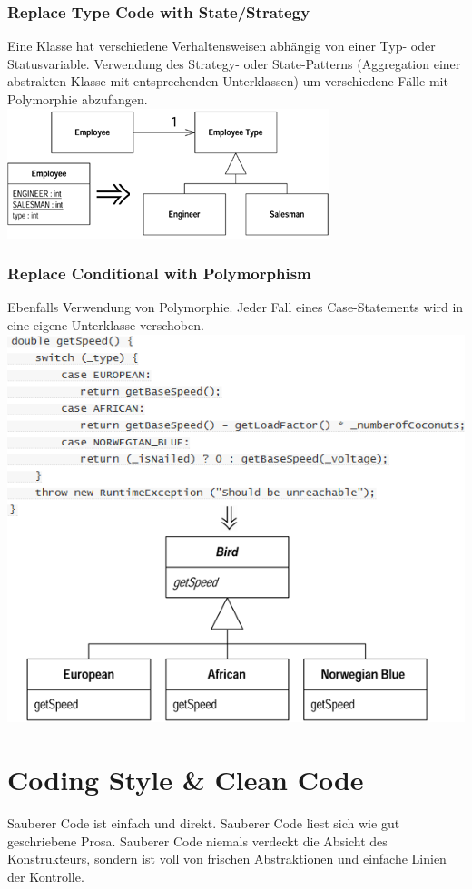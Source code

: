 \documentclass[a4paper,10pt]{article}
\begin{document}
\subsubsection{Replace Type Code with State/Strategy}
Eine Klasse hat verschiedene Verhaltensweisen abhängig von einer Typ- oder Statusvariable. Verwendung des Strategy- oder State-Patterns (Aggregation einer abstrakten Klasse mit entsprechenden Unterklassen) um verschiedene Fälle mit Polymorphie abzufangen.\\
\includegraphics[scale=.6]{refactoring_5.png}
\subsubsection{Replace Conditional with Polymorphism}
Ebenfalls Verwendung von Polymorphie. Jeder Fall eines Case-Statements wird in eine eigene Unterklasse verschoben.\\
\includegraphics[scale=.6]{refactoring_6.png}

\pagebreak
\section{Coding Style \& Clean Code}
Sauberer Code ist einfach und direkt. Sauberer Code liest sich wie gut geschriebene Prosa. Sauberer Code niemals verdeckt die Absicht des Konstrukteurs, sondern ist voll von frischen Abstraktionen und einfache Linien der Kontrolle. \\
\end{document}
